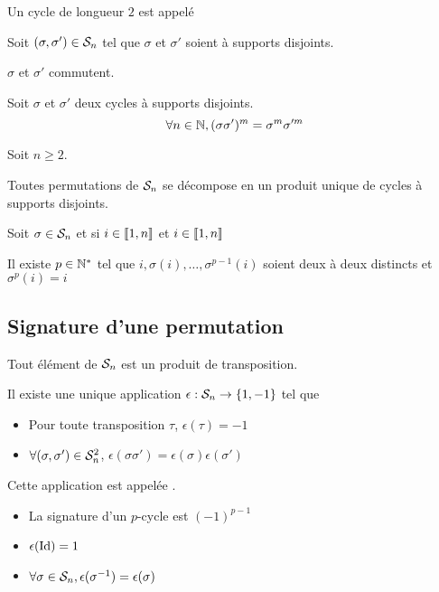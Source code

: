 \begin{dfn}
  Un cycle de longueur $2$ est appelé 
\end{dfn}

\begin{prp}
  Soit $(\sigma, \sigma') \in \mathcal{S}_n$ tel que $\sigma$ et $\sigma'$ soient à supports disjoints.
  
  $\sigma$ et $\sigma'$ commutent.
\end{prp}

\begin{cor}
  Soit $\sigma$ et $\sigma'$ deux cycles à supports disjoints.
  \[
    \forall n \in \mathbb{N}, (\sigma \sigma')^m = \sigma^m \sigma'^m
  \]
\end{cor}

\begin{thm}
  Soit $n \geq 2$.

  Toutes permutations de $\mathcal{S}_n$ se décompose en un produit unique de cycles à
  supports disjoints.
\end{thm}

\begin{prp}
  Soit $\sigma \in \mathcal{S}_n$ et si $i \in \llbracket 1, n \rrbracket$ et $i \in \llbracket 1, n \rrbracket$
  
  Il existe $p \in \mathbb{N}^*$ tel que $i, \sigma(i), \ldots, \sigma^{p - 1}(i)$ soient deux à deux
  distincts et $\sigma^p(i) = i$
\end{prp}

\subsection{Signature d'une permutation}

\begin{thm}
  Tout élément de $\mathcal{S}_n$ est un produit de transposition.
\end{thm}

\begin{dfn}
  Il existe une unique application $\epsilon : \mathcal{S}_n \to \{ 1, -1 \}$
  tel que
  \begin{itemize}
    \item Pour toute transposition $\tau$, $\epsilon(\tau) = -1$
    \item $\forall (\sigma, \sigma') \in \mathcal{S}_n^2$, $\epsilon(\sigma \sigma') = \epsilon(\sigma)\epsilon(\sigma')$
  \end{itemize}
  Cette application est appelée .
\end{dfn}

\begin{prp}
  \begin{itemize}
    \item La signature d'un $p$-cycle est $(-1)^{p - 1}$
    \item $\epsilon(\operatorname{Id}) = 1$
    \item $\forall \sigma \in \mathcal{S}_n, \epsilon(\sigma^{-1}) = \epsilon(\sigma)$
  \end{itemize}
\end{prp}

